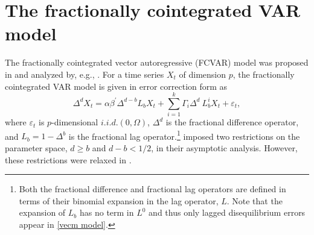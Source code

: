 \documentclass[article]{jss}
\begin{document}


\section{The fractionally cointegrated VAR model} \label{sec:fcvar}


The fractionally cointegrated vector autoregressive (FCVAR) model was proposed in \cite{Johansen2008} and analyzed by, e.g., \cite{johniel2010,johansen2012likelihood}. For a time series $X_{t}$ of dimension $p$, the fractionally cointegrated VAR model is given in error correction form as
\begin{equation}
\Delta^{d}X_{t}= \alpha \beta^{\prime} \Delta^{d-b} L_{b} X_{t} + 
\sum_{i=1}^{k}\Gamma_{i}\Delta^{d}\ L_{b}^{i}X_{t}
+ \varepsilon_{t},
\label{vecm model}%
\end{equation}
where $\varepsilon_{t}$ is $p$-dimensional $i.i.d.(0,\Omega)$, $\Delta^{d}$ is the fractional difference operator, and $L_{b}=1-\Delta^{b}$ is the fractional lag operator.\footnote{Both the fractional difference and fractional lag operators are defined in terms of their binomial expansion in the lag operator, $L$. Note that the expansion of $L_{b}$ has no term in $L^{0}$ and thus only lagged disequilibrium errors appear in \eqref{vecm model}.} \cite{johansen2012likelihood} imposed two restrictions on the parameter space, $d\geq b$ and $d-b<1/2$, in their asymptotic analysis. However, these restrictions were relaxed in \cite{JN2018b,JN2018}.
\end{document}
